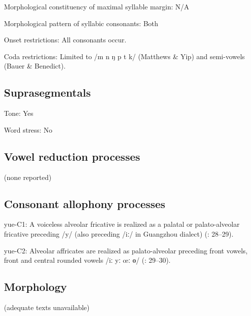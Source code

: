 {\begin{appendixdesc}
\item[Morphological constituency of maximal syllable margin:] N/A

\item[Morphological pattern of syllabic consonants:] Both

\item[Onset restrictions:] All consonants occur.

\item[Coda restrictions:] Limited to /m n ŋ p t k/ (Matthews \& Yip) and semi-vowels (Bauer \& Benedict).
\end{appendixdesc}
\subsection*{Suprasegmentals}
\begin{appendixdesc}
\item[Tone:] Yes

\item[Word stress:] No
\end{appendixdesc}
\subsection*{Vowel reduction processes}

(none reported)
\subsection*{Consonant allophony processes}
\begin{appendixdesc}

\item[yue-C1:] A voiceless alveolar fricative is realized as a palatal or palato-alveolar fricative preceding /y/ (also preceding /iː/ in Guangzhou dialect) (\citealt{BauerBenedict1997}: 28--29).

\item[yue-C2:] Alveolar affricates are realized as palato-alveolar preceding front vowels, front and central rounded vowels /iː yː œː ɵ/ (\citealt{BauerBenedict1997}: 29--30).
\end{appendixdesc}
\subsection*{Morphology}

(adequate texts unavailable)%
}
